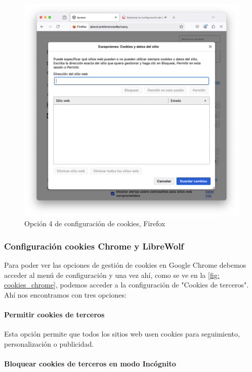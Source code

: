 \begin{figure}[H]   
    \includegraphics[width=\textwidth]{opcion4_ej14.png}
    \caption{Opción 4 de configuración de cookies, Firefox}
    \label{fig:opcion4_ej14}
\end{figure}


\subsubsection{Configuración cookies Chrome y LibreWolf}

Para poder ver las opciones de gestión de cookies en Google Chrome debemos acceder al menú de configuración y una vez ahí, como se ve en la \ref{fig: cookies_chrome}, podemos acceder a la configuración de "Cookies de terceros". Ahí nos encontramos con tres opciones: 

\paragraph{Permitir cookies de terceros}

Esta opción permite que todos los sitios web usen cookies para seguimiento, personalización o publicidad. 

\paragraph{Bloquear cookies de terceros en modo Incógnito}

